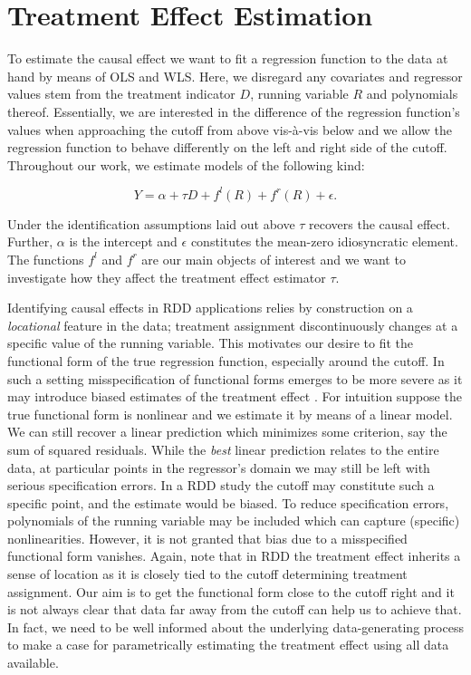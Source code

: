 
\section{Treatment Effect Estimation} %
\label{sec: estim}

To estimate the causal effect we want to fit a regression function to the data at hand by means of OLS and WLS. Here, we disregard any covariates and regressor values stem from the treatment indicator $D$, running variable $R$ and polynomials thereof. Essentially, we are interested in the difference of the regression function's values when approaching the cutoff from above vis-à-vis below and we allow the regression function to behave differently on the left and right side of the cutoff. Throughout our work, we estimate models of the following kind:

\begin{equation}

Y = \alpha + \tau D + f^{l}(R) + f^{r}(R) + \epsilon .
\label{eq: model_general}

\end{equation}

Under the identification assumptions laid out above $\tau$ recovers the causal effect. Further, $\alpha$ is the intercept and $\epsilon$ constitutes the mean-zero idiosyncratic element. The functions $f^{l}$ and $f^{r}$ are our main objects of interest and we want to investigate how they affect the treatment effect estimator $\tau$.

Identifying causal effects in RDD applications relies by construction on a \textit{locational} feature in the data; treatment assignment discontinuously changes at a specific value of the running variable. This motivates our desire to fit the functional form of the true regression function, especially around the cutoff. In such a setting misspecification of functional forms emerges to be more severe as it may introduce biased estimates of the treatment effect \cite{lee_lemieux_2010}. For intuition suppose the true functional form is nonlinear and we estimate it by means of a linear model. We can still recover a linear prediction which minimizes some criterion, say the sum of squared residuals. While the \textit{best} linear prediction relates to the entire data, at particular points in the regressor's domain we may still be left with serious specification errors. In a RDD study the cutoff may constitute such a specific point, and the estimate would be biased. To reduce specification errors, polynomials of the running variable may be included which can capture (specific) nonlinearities. However, it is not granted that bias due to a misspecified functional form vanishes. Again, note that in RDD the treatment effect inherits a sense of location as it is closely tied to the cutoff determining treatment assignment. Our aim is to get the functional form close to the cutoff right and it is not always clear that data far away from the cutoff can help us to achieve that. In fact, we need to be well informed about the underlying data-generating process to make a case for parametrically estimating the treatment effect using all data available.


